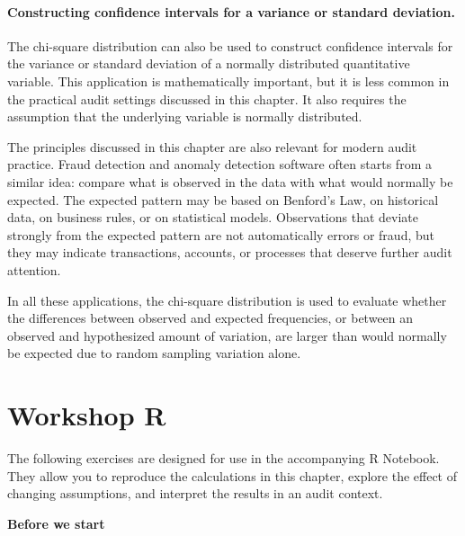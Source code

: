 \paragraph{Constructing confidence intervals for a variance or standard deviation.} The chi-square distribution can also be used to construct confidence intervals for the variance or standard deviation of a normally distributed quantitative variable. This application is mathematically important, but it is less common in the practical audit settings discussed in this chapter. It also requires the assumption that the underlying variable is normally distributed.

\medskip
The principles discussed in this chapter are also relevant for modern audit practice. Fraud detection and anomaly detection software often starts from a similar idea: compare what is observed in the data with what would normally be expected. The expected pattern may be based on Benford's Law, on historical data, on business rules, or on statistical models. Observations that deviate strongly from the expected pattern are not automatically errors or fraud, but they may indicate transactions, accounts, or processes that deserve further audit attention.

In all these applications, the chi-square distribution is used to evaluate whether the differences between observed and expected frequencies, or between an observed and hypothesized amount of variation, are larger than would normally be expected due to random sampling variation alone.

\section{Workshop R}

The following exercises are designed for use in the accompanying R Notebook.
They allow you to reproduce the calculations in this chapter, explore the
effect of changing assumptions, and interpret the results in an audit context.

\begin{exercise}

\textbf{Before we start}



\end{exercise}

